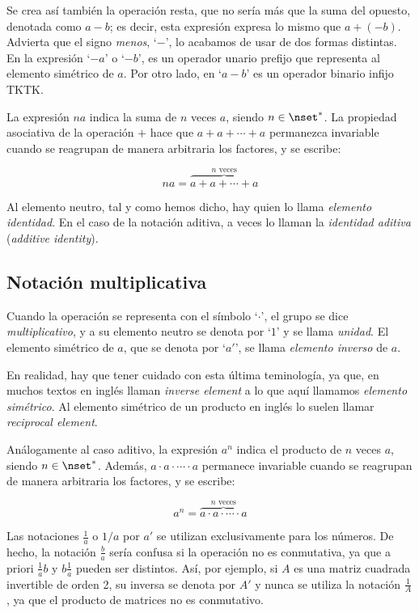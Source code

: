 Se crea así también la operación resta, que no sería más que la suma del
opuesto, denotada como $a - b$; es decir, esta expresión expresa lo mismo
que $a + ({-b})$. Advierta que el signo \emph{menos}, `$-$', lo acabamos de
usar de dos formas distintas. En la expresión `${-a}$' o `${-b}$', es un
operador unario prefijo que representa al elemento simétrico de $a$. Por
otro lado, en `$a - b$' es un operador binario infijo TKTK.

La expresión $na$ indica la suma de $n$ veces $a$, siendo $n \in \nset^*$.
La propiedad asociativa de la operación $+$ hace que $a + a + \cdots + a$
permanezca invariable cuando se reagrupan de manera arbitraria los factores,
y se escribe:

$$ na = \overbrace{a + a + \cdots + a}^{\text{$n$ veces}} $$

Al elemento neutro, tal y como hemos dicho, hay quien lo llama
\emph{elemento identidad}. En el caso de la notación aditiva, a veces lo
llaman la \emph{identidad aditiva} (\emph{additive identity}).





\subsection{Notación multiplicativa}

Cuando la operación se representa con el símbolo `$\cdot$', el grupo se dice
\emph{multiplicativo}, y a su elemento neutro se denota por `$1$' y se llama
\emph{unidad}. El elemento simétrico de $a$, que se denota por `$a'$',
se llama \emph{elemento inverso} de $a$.

En realidad, hay que tener cuidado con esta última teminología, ya que, en
muchos textos en inglés llaman \emph{inverse element} a lo que aquí llamamos
\emph{elemento simétrico}. Al elemento simétrico de un producto en inglés lo
suelen llamar \emph{reciprocal element}.

Análogamente al caso aditivo, la expresión $a^n$ indica el producto de $n$
veces $a$, siendo $n \in \nset^*$. Además, $a \cdot a \cdot \cdots \cdot a$
permanece invariable cuando se reagrupan de manera arbitraria los factores,
y se escribe:

$$ a^n = \overbrace{a \cdot a \cdot \cdots \cdot a}^{\text{$n$ veces}} $$

Las notaciones $\frac{1}{a}$ o $1/a$ por $a'$ se utilizan exclusivamente
para los números. De hecho, la notación $\frac{b}{a}$ sería confusa si la
operación no es conmutativa, ya que a priori $\frac{1}{a} b$ y $b
\frac{1}{a}$ pueden ser distintos. Así, por ejemplo, si $A$ es una matriz
cuadrada invertible de orden 2, su inversa se denota por $A'$ y nunca se
utiliza la notación $\frac{1}{A}$, ya que el producto de matrices no es
conmutativo.

